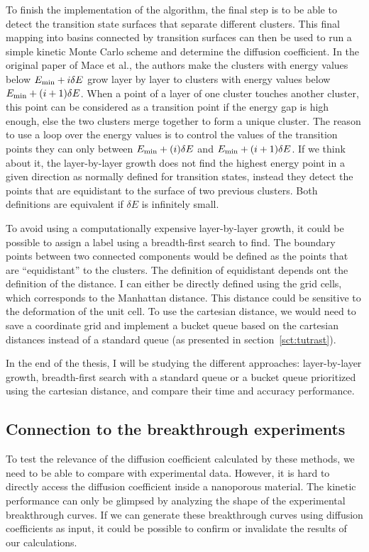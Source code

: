 \documentclass[main]{subfiles}
\begin{document}
To finish the implementation of the algorithm, the final step is to be able to detect the transition state surfaces that separate different clusters. This final mapping into basins connected by transition surfaces can then be used to run a simple kinetic Monte Carlo scheme and determine the diffusion coefficient. In the original paper of Mace et al.\autocite{Mace_2019}, the authors make the clusters with energy values below $E_{\text{min}}+i\delta E$ grow layer by layer to clusters with energy values below $E_{\text{min}}+(i+1)\delta E$. When a point of a layer of one cluster touches another cluster, this point can be considered as a transition point if the energy gap is high enough, else the two clusters merge together to form a unique cluster. The reason to use a loop over the energy values is to control the values of the transition points they can only between $E_{\text{min}}+(i)\delta E$ and $E_{\text{min}}+(i+1)\delta E$. If we think about it, the layer-by-layer growth does not find the highest energy point in a given direction as normally defined for transition states, instead they detect the points that are equidistant to the surface of two previous clusters. Both definitions are equivalent if $\delta E$ is infinitely small.

To avoid using a computationally expensive layer-by-layer growth, it could be possible to assign a label using a breadth-first search to find. The boundary points between two connected components would be defined as the points that are ``equidistant'' to the clusters. The definition of equidistant depends ont the definition of the distance. I can either be directly defined using the grid cells, which corresponds to the Manhattan distance. This distance could be sensitive to the deformation of the unit cell. To use the cartesian distance, we would need to save a coordinate grid and implement a bucket queue based on the cartesian distances instead of a standard queue (as presented in section~\ref{sct:tutrast}).

In the end of the thesis, I will be studying the different approaches: layer-by-layer growth, breadth-first search with a standard queue or a bucket queue prioritized using the cartesian distance, and compare their time and accuracy performance.

\subsection{Connection to the breakthrough experiments}

To test the relevance of the diffusion coefficient calculated by these methods, we need to be able to compare with experimental data. However, it is hard to directly access the diffusion coefficient inside a nanoporous material. The kinetic performance can only be glimpsed by analyzing the shape of the experimental breakthrough curves. If we can generate these breakthrough curves using diffusion coefficients as input, it could be possible to confirm or invalidate the results of our calculations.
\end{document}
